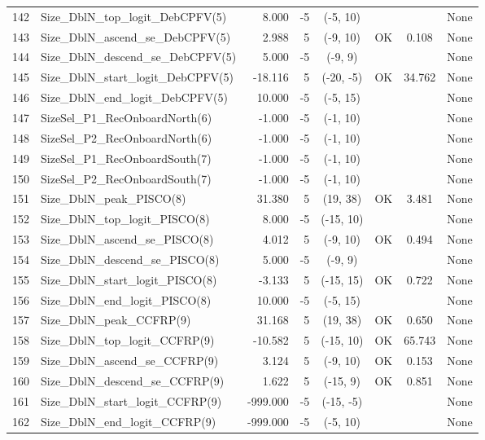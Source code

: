 \documentclass[12pt,]{article}
\begin{document}
\begin{landscape}
\begin{longtable}{rlrrcccp{1.5in}}
  142 & Size\_DblN\_top\_logit\_DebCPFV(5) & 8.000 & -5 & (-5, 10) &  &  & None \\ 
  143 & Size\_DblN\_ascend\_se\_DebCPFV(5) & 2.988 & 5 & (-9, 10) & OK & 0.108 & None \\ 
  144 & Size\_DblN\_descend\_se\_DebCPFV(5) & 5.000 & -5 & (-9, 9) &  &  & None \\ 
  145 & Size\_DblN\_start\_logit\_DebCPFV(5) & -18.116 & 5 & (-20, -5) & OK & 34.762 & None \\ 
  146 & Size\_DblN\_end\_logit\_DebCPFV(5) & 10.000 & -5 & (-5, 15) &  &  & None \\ 
  147 & SizeSel\_P1\_RecOnboardNorth(6) & -1.000 & -5 & (-1, 10) &  &  & None \\ 
  148 & SizeSel\_P2\_RecOnboardNorth(6) & -1.000 & -5 & (-1, 10) &  &  & None \\ 
  149 & SizeSel\_P1\_RecOnboardSouth(7) & -1.000 & -5 & (-1, 10) &  &  & None \\ 
  150 & SizeSel\_P2\_RecOnboardSouth(7) & -1.000 & -5 & (-1, 10) &  &  & None \\ 
  151 & Size\_DblN\_peak\_PISCO(8) & 31.380 & 5 & (19, 38) & OK & 3.481 & None \\ 
  152 & Size\_DblN\_top\_logit\_PISCO(8) & 8.000 & -5 & (-15, 10) &  &  & None \\ 
  153 & Size\_DblN\_ascend\_se\_PISCO(8) & 4.012 & 5 & (-9, 10) & OK & 0.494 & None \\ 
  154 & Size\_DblN\_descend\_se\_PISCO(8) & 5.000 & -5 & (-9, 9) &  &  & None \\ 
  155 & Size\_DblN\_start\_logit\_PISCO(8) & -3.133 & 5 & (-15, 15) & OK & 0.722 & None \\ 
  156 & Size\_DblN\_end\_logit\_PISCO(8) & 10.000 & -5 & (-5, 15) &  &  & None \\ 
  157 & Size\_DblN\_peak\_CCFRP(9) & 31.168 & 5 & (19, 38) & OK & 0.650 & None \\ 
  158 & Size\_DblN\_top\_logit\_CCFRP(9) & -10.582 & 5 & (-15, 10) & OK & 65.743 & None \\ 
  159 & Size\_DblN\_ascend\_se\_CCFRP(9) & 3.124 & 5 & (-9, 10) & OK & 0.153 & None \\ 
  160 & Size\_DblN\_descend\_se\_CCFRP(9) & 1.622 & 5 & (-15, 9) & OK & 0.851 & None \\ 
  161 & Size\_DblN\_start\_logit\_CCFRP(9) & -999.000 & -5 & (-15, -5) &  &  & None \\ 
  162 & Size\_DblN\_end\_logit\_CCFRP(9) & -999.000 & -5 & (-5, 10) &  &  & None \\ 

\end{longtable}
\end{landscape}
\end{document}
